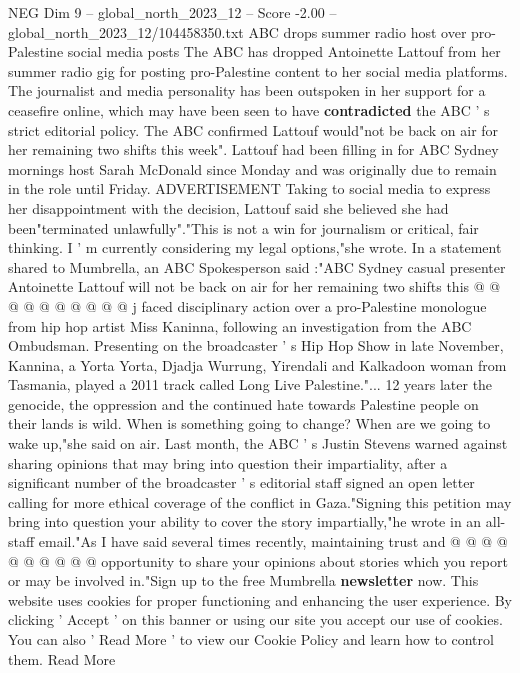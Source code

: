 \begin{textsample}{NEG Dim 9 – global\_north\_2023\_12 – Score -2.00 – global\_north\_2023\_12/104458350.txt}  \label{ex:f9_neg_289}
ABC drops summer radio host over pro-Palestine social media posts The ABC has dropped Antoinette Lattouf from her summer radio gig for posting pro-Palestine content to her social media platforms.
The journalist and media personality has been outspoken in her support for a ceasefire online, which may have been seen to have \textbf{contradicted} the ABC ' s strict editorial policy.
The ABC confirmed Lattouf would"not be back on air for her remaining two shifts this week".
Lattouf had been filling in for ABC Sydney mornings host Sarah McDonald since Monday and was originally due to remain in the role until Friday.
ADVERTISEMENT Taking to social media to express her disappointment with the decision, Lattouf said she believed she had been"terminated unlawfully"."This is not a win for journalism or critical, fair thinking.
I ' m currently considering my legal options,"she wrote.
In a statement shared to Mumbrella, an ABC Spokesperson said :"ABC Sydney casual presenter Antoinette Lattouf will not be back on air for her remaining two shifts this @ @ @ @ @ @ @ @ @ @ j faced disciplinary action over a pro-Palestine monologue from hip hop artist Miss Kaninna, following an investigation from the ABC Ombudsman.
Presenting on the broadcaster ' s Hip Hop Show in late November, Kannina, a Yorta Yorta, Djadja Wurrung, Yirendali and Kalkadoon woman from Tasmania, played a 2011 track called Long Live Palestine."... 12 years later the genocide, the oppression and the continued hate towards Palestine people on their lands is wild.
When is something going to change?
When are we going to wake up,"she said on air.
Last month, the ABC ' s Justin Stevens warned against sharing opinions that may bring into question their impartiality, after a significant number of the broadcaster ' s editorial staff signed an open letter calling for more ethical coverage of the conflict in Gaza."Signing this petition may bring into question your ability to cover the story impartially,"he wrote in an all-staff email."As I have said several times recently, maintaining trust and @ @ @ @ @ @ @ @ @ @ opportunity to share your opinions about stories which you report or may be involved in."Sign up to the free Mumbrella \textbf{newsletter} now.
This website uses cookies for proper functioning and enhancing the user experience.
By clicking ' Accept ' on this banner or using our site you accept our use of cookies.
You can also ' Read More ' to view our Cookie Policy and learn how to control them.
Read More

\end{textsample}
